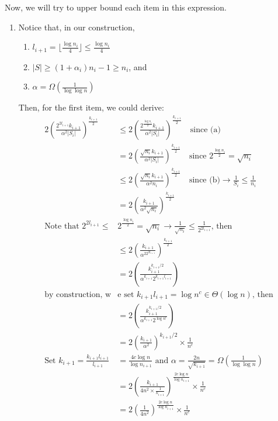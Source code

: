 \documentclass[a4paper, english]{paper}
\begin{document}
	Now, we will try to upper bound each item in this expression.
	\begin{enumerate}
		\item Notice that, in our construction, 
		\begin{enumerate}
			\item $l_{i+1} = \lfloor\frac{\log n_i}{4}\rfloor\le\frac{\log n_i}{4}$
			\item $|S|\ge (1+\alpha_i)n_i-1\ge n_i$, and
			\item $\alpha = \Omega(\frac1{\log\log n})$
		\end{enumerate}
		Then, for the first item, we could derive:
		\begin{align*}
		2\left(\frac{2^{2l_{i+1}}k_{i+1}}{\alpha^2 |S_i|}\right)^{\frac{k_{i+1}}2}&\le 2\left(\frac{2^{\frac{\log n_i}{2}}k_{i+1}}{\alpha^2 |S_i|}\right)^{\frac{k_{i+1}}2}\quad\text{since (a)}\\
		& = 2\left(\frac{\sqrt{n_i}k_{i+1}}{\alpha^2 |S_i|}\right)^{\frac{k_{i+1}}2}\quad\text{since }2^{\frac{\log n_i}{2}} = \sqrt{n_i} \\
		& \le 2\left(\frac{\sqrt{n_i}k_{i+1}}{\alpha^2 n_i}\right)^{\frac{k_{i+1}}2}\quad\text{since (b)}\rightarrow\frac1{S_i}\le\frac1{n_i}\\
		& = 2\left(\frac{k_{i+1}}{\alpha^2\sqrt{n_i}}\right)^{\frac{k_{i+1}}2}\\
		\text{Note that }2^{2l_{i+1}}\le&2^{\frac{\log n_i}{2}} = \sqrt{n_i}\rightarrow \frac1{\sqrt{n_i}}\le\frac1{2^{2l_{i+1}}}\text{, then}\\
		& \le 2\left(\frac{k_{i+1}}{\alpha^22^{2l_{i+1}}}\right)^{\frac{k_{i+1}}2}\\
		& =  2\left(\frac{k_{i+1}^{k_{i+1}/2}}{\alpha^{k_{i+1}}2^{k_{i+1}l_{i+1}}}\right)\\
		\text{by construction, w}&\text{e set } k_{i+1}l_{i+1} = \log n^c \in \Theta(\log n )\text{, then}\\
		& =  2\left(\frac{k_{i+1}^{k_{i+1}/2}}{\alpha^{k_{i+1}}2^{\log n^c}}\right)\\
		& =  2\left(\frac{k_{i+1}}{\alpha^2}\right)^{k_{i+1}/2}\times\frac1{n^c}\\
		\text{Set } k_{i+1} = \frac{k_{i+1}l_{i+1}}{l_{i+1}}&=\frac{4c\log n}{\log n_{i+1}}\text{ and }\alpha = \frac{2n}{\sqrt{k_{i+1}}}=\Omega(\frac1{\log\log n})\\
		& = 2\left(\frac{k_{i+1}}{4n^2\times\frac1{k_{i+1}}}\right)^{\frac{2c\log n}{\log n_{i+1}}}\times\frac1{n^c}\\
		& = 2\left(\frac1{4n^2}\right)^{\frac{2c\log n}{\log n_{i+1}}}\times\frac1{n^c}\\

\end{align*}
\end{enumerate}
\end{document}
